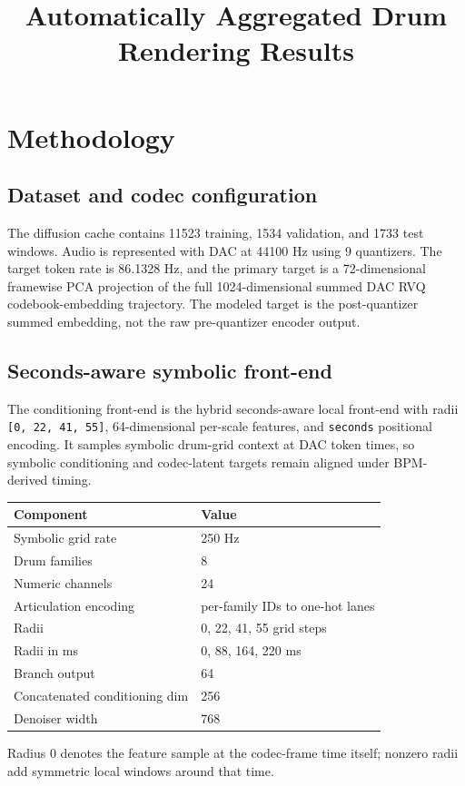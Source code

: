 \documentclass[11pt]{article}
\title{Automatically Aggregated Drum Rendering Results}
\author{}
\date{}
\begin{document}
\maketitle
\section{Methodology}
\subsection{Dataset and codec configuration}
The diffusion cache contains 11523 training, 1534 validation, and 1733 test windows. Audio is represented with DAC at 44100 Hz using 9 quantizers. The target token rate is 86.1328 Hz, and the primary target is a 72-dimensional framewise PCA projection of the full 1024-dimensional summed DAC RVQ codebook-embedding trajectory. The modeled target is the post-quantizer summed embedding, not the raw pre-quantizer encoder output.

\subsection{Seconds-aware symbolic front-end}
The conditioning front-end is the hybrid seconds-aware local front-end with radii \texttt{[0, 22, 41, 55]}, 64-dimensional per-scale features, and \texttt{seconds} positional encoding. It samples symbolic drum-grid context at DAC token times, so symbolic conditioning and codec-latent targets remain aligned under BPM-derived timing.
\begin{center}\small\begin{tabular}{ll}\toprule Component & Value \\ \midrule Symbolic grid rate & 250 Hz \\ Drum families & 8 \\ Numeric channels & 24 \\ Articulation encoding & per-family IDs to one-hot lanes \\ Radii & 0, 22, 41, 55 grid steps \\ Radii in ms & 0, 88, 164, 220 ms \\ Branch output & 64 \\ Concatenated conditioning dim & 256 \\ Denoiser width & 768 \\ \bottomrule\end{tabular}\end{center}
Radius 0 denotes the feature sample at the codec-frame time itself; nonzero radii add symmetric local windows around that time.
\end{document}
